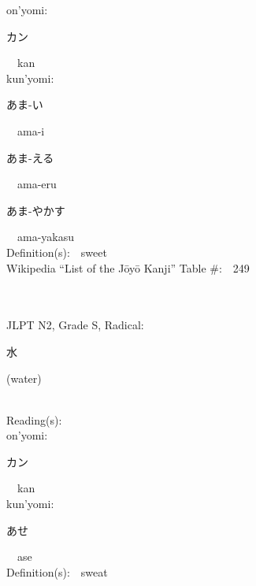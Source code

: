 \begin{multicols}{2}
{\hspace*{1em}}on'yomi:\ \ \\
{\hspace*{2em}}{\begin{CJK}{UTF8}{min} カン \end{CJK}}\ \ kan\ \ \\
{\hspace*{1em}}kun'yomi:\ \ \\
{\hspace*{2em}}{\begin{CJK}{UTF8}{min} あま-い \end{CJK}}\ \ ama-i\ \ \\
{\hspace*{2em}}{\begin{CJK}{UTF8}{min} あま-える \end{CJK}}\ \ ama-eru\ \ \\
{\hspace*{2em}}{\begin{CJK}{UTF8}{min} あま-やかす \end{CJK}}\ \ ama-yakasu\ \ \\
Definition(s):\ \ sweet \\
Wikipedia ``List of the J\=oy\=o Kanji'' Table \#:\ \ 249 \\
\ \ \\
{\fontsize{34pt}{40pt}  }\ \ \\  %
{JLPT N2, Grade S, Radical:\ \ {\begin{CJK}{UTF8}{min} 水 \end{CJK}} (water) } \\
Reading(s):\ \ \\
{\hspace*{1em}}on'yomi:\ \ \\
{\hspace*{2em}}{\begin{CJK}{UTF8}{min} カン \end{CJK}}\ \ kan\ \ \\
{\hspace*{1em}}kun'yomi:\ \ \\
{\hspace*{2em}}{\begin{CJK}{UTF8}{min} あせ \end{CJK}}\ \ ase\ \ \\
Definition(s):\ \ sweat \\

\end{multicols}
